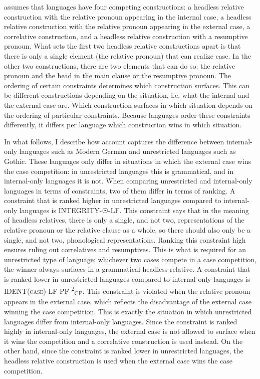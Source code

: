 \citet{vogel2002} assumes that languages have four competing constructions: a headless relative construction with the relative pronoun appearing in the internal case, a headless relative construction with the relative pronoun appearing in the external case, a correlative construction, and a headless relative construction with a resumptive pronoun. What sets the first two headless relative constructions apart is that there is only a single element (the relative pronoun) that can realize case. In the other two constructions, there are two elements that can do so: the relative pronoun and the head in the main clause or the resumptive pronoun. The ordering of certain constraints determines which construction surfaces. This can be different constructions depending on the situation, i.e. what the internal and the external case are. Which construction surfaces in which situation depends on the ordering of particular constraints. Because languages order these constraints differently, it differs per language which construction wins in which situation.

In what follows, I describe how  account captures the difference between internal-only languages such as Modern German and unrestricted languages such as Gothic. These languages only differ in situations in which the external case wins the case competition: in unrestricted languages this is grammatical, and in internal-only languages it is not. 
When comparing unrestricted and internal-only languages in terms of constraints, two of them differ in terms of ranking. A constraint that is ranked higher in unrestricted languages compared to internal-only languages is INTEGRITY-{\Large{☉}}-LF. This constraint says that in the meaning of headless relatives, there is only a single, and not two, representations of the relative pronoun or the relative clause as a whole, so there should also only be a single, and not two, phonological representations. Ranking this constraint high ensures ruling out correlatives and resumptives. This is what is required for an unrestricted type of language: whichever two cases compete in a case competition, the winner always surfaces in a grammatical headless relative.
A constraint that is ranked lower in unrestricted languages compared to internal-only languages is IDENT\textsc{(case)}-LF-PF-\textsuperscript{2}\textsubscript{CP}. 
This constraint is violated when the relative pronoun appears in the external case, which reflects the disadvantage of the external case winning the case competition. This is exactly the situation in which unrestricted languages differ from internal-only languages. Since the constraint is ranked highly in internal-only languages, the external case is not allowed to surface when it wins the competition and a correlative construction is used instead. On the other hand, since the constraint is ranked lower in unrestricted languages, the headless relative construction is used when the external case wins the case competition.

